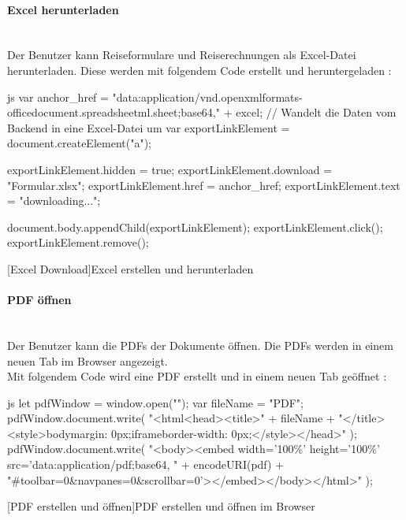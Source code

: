 \paragraph{Excel herunterladen}~\\
Der Benutzer kann Reiseformulare und Reiserechnungen als Excel-Datei herunterladen. Diese werden mit folgendem Code erstellt und heruntergeladen \cite{down_excel}:
\begin{code}{js}
	var anchor_href =
	"data:application/vnd.openxmlformats-officedocument.spreadsheetml.sheet;base64," +
	excel;	// Wandelt die Daten vom Backend in eine Excel-Datei um
	var exportLinkElement = document.createElement("a");
	
	exportLinkElement.hidden = true;
	exportLinkElement.download = "Formular.xlsx";
	exportLinkElement.href = anchor_href;
	exportLinkElement.text = "downloading...";
	
	document.body.appendChild(exportLinkElement);
	exportLinkElement.click();
	exportLinkElement.remove();
\end{code}
[Excel Download]{Excel erstellen und herunterladen}~\\
\paragraph{PDF öffnen}~\\
Der Benutzer kann die PDFs der Dokumente öffnen. Die PDFs werden in einem neuen Tab im Browser angezeigt.\\
Mit folgendem Code wird eine PDF erstellt und in einem neuen Tab geöffnet \cite{sof_pdf}:
\begin{code}{js}
	let pdfWindow = window.open("");
	var fileName = "PDF";
	pdfWindow.document.write(
	"<html<head><title>" +
	fileName +
	"</title><style>body{margin: 0px;}iframe{border-width: 0px;}</style></head>"
	);
	pdfWindow.document.write(
	"<body><embed width='100\%' height='100\%' src='data:application/pdf;base64, " +
	encodeURI(pdf) +
	"#toolbar=0\&navpanes=0\&scrollbar=0'></embed></body></html>"
	);
\end{code}
[PDF erstellen und öffnen]{PDF erstellen und öffnen im Browser}~
\newpage
